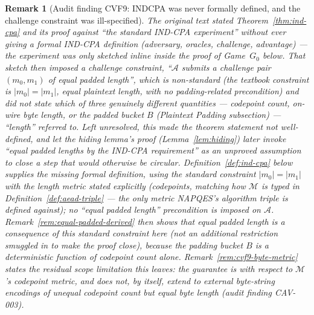 \documentclass[11pt,a4paper]{article}
\newtheorem{remark}[theorem]{Remark}
\begin{document}
\begin{remark}[Audit finding CVF9: INDCPA was never formally defined, and the challenge constraint was ill-specified]
\label{rem:cvf9}
The original text stated Theorem~\ref{thm:ind-cpa} and its proof against
``the standard IND-CPA experiment'' without ever giving a formal IND-CPA
definition (adversary, oracles, challenge, advantage) — the experiment was
only sketched inline inside the proof of Game~$G_0$ below. That sketch
then imposed a challenge constraint, ``$\mathcal{A}$ submits a challenge
pair $(m_0,m_1)$ of \emph{equal padded length}'', which is non-standard
(the textbook constraint is $|m_0|=|m_1|$, equal \emph{plaintext} length,
with no padding-related precondition) and did not state which of three
genuinely different quantities --- codepoint count, on-wire byte length,
or the padded bucket $B$ (Plaintext Padding subsection) --- ``length''
referred to. Left unresolved, this made the theorem statement not
well-defined, and let the hiding lemma's proof (Lemma~\ref{lem:hiding})
later invoke ``equal padded lengths by the IND-CPA requirement'' as an
unproved assumption to close a step that would otherwise be circular.
Definition~\ref{def:ind-cpa} below supplies the missing formal definition,
using the standard constraint $|m_0|=|m_1|$ with the length metric stated
explicitly (codepoints, matching how $\mathcal{M}$ is typed in
Definition~\ref{def:aead-triple} --- the only metric NAPQES's algorithm
triple is defined against); no ``equal padded length'' precondition is
imposed on $\mathcal{A}$. Remark~\ref{rem:equal-padded-derived} then shows
that equal padded length is a \emph{consequence} of this standard
constraint here (not an additional restriction smuggled in to make the
proof close), because the padding bucket $B$ is a deterministic function
of codepoint count alone. Remark~\ref{rem:cvf9-byte-metric} states the
residual scope limitation this leaves: the guarantee is with respect to
$\mathcal{M}$'s codepoint metric, and does not, by itself, extend to
external byte-string encodings of unequal codepoint count but equal byte
length (audit finding CAV-003).
\end{remark}
\end{document}
